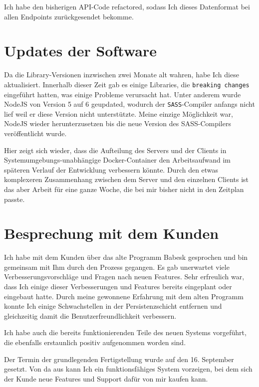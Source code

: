 \documentclass[a4paper,10pt]{scrartcl}
\begin{document}
  Ich habe den bisherigen API-Code refactored, sodass Ich dieses Datenformat bei
  allen Endpoints zurückgesendet bekomme.

\section{Updates der Software}

  Da die Library-Versionen inzwischen zwei Monate alt wahren, habe Ich diese
  aktualisiert.
  Innerhalb dieser Zeit gab es einige Libraries, die
  \lstinline{breaking changes} eingeführt hatten, was einige Probleme
  verursacht hat.
  Unter anderem wurde NodeJS von Version 5 auf 6 geupdated, wodurch der
  \lstinline{SASS}-Compiler anfangs nicht lief weil er diese Version nicht
  unterstützte.
  Meine einzige Möglichkeit war, NodeJS wieder herunterzusetzen bis die neue
  Version des SASS-Compilers veröffentlicht wurde.

  Hier zeigt sich wieder, dass die Aufteilung des Servers und der Clients
  in Systemumgebungs-unabhängige Docker-Container den Arbeitsaufwand im
  späteren Verlauf der Entwicklung verbessern könnte.
  Durch den etwas komplexeren Zusammenhang zwischen dem Server und den einzelnen
  Clients ist das aber Arbeit für eine ganze Woche, die bei mir bisher nicht in
  den Zeitplan passte.

\section{Besprechung mit dem Kunden}

  Ich habe mit dem Kunden über das alte Programm Babesk gesprochen und bin
  gemeinsam mit Ihm durch den Prozess gegangen.
  Es gab unerwartet viele Verbesserungsvorschläge und Fragen nach neuen
  Features.
  Sehr erfreulich war, dass Ich einige dieser Verbesserungen und Features
  bereits eingeplant oder eingebaut hatte.
  Durch meine gewonnene Erfahrung mit dem alten Programm konnte Ich einige
  Schwachstellen in der Persistenzschicht entfernen und gleichzeitig damit
  die Benutzerfreundlichkeit verbessern.

  Ich habe auch die bereits funktionierenden Teile des neuen Systems vorgeführt,
  die ebenfalls erstaunlich positiv aufgenommen worden sind.

  Der Termin der grundlegenden Fertigstellung wurde auf den 16. September
  gesetzt.
  Von da aus kann Ich ein funktionsfähiges System vorzeigen, bei dem sich der
  Kunde neue Features und Support dafür von mir kaufen kann.
\end{document}
